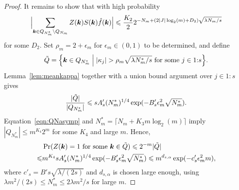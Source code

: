 \documentclass{article}
\theoremstyle{definition}
\renewcommand{\le}{\leqslant}
\renewcommand{\leq}{\leqslant}
\newcommand{\bsk}{\boldsymbol{k}}
\begin{document}
\begin{proof}
It remains to show that with high probability
\begin{equation}\label{eqn:K2over2}
    \Bigl|\sum_{\bsk\in Q_{N^*_m}\setminus Q_{N_m} } Z(\bsk)S(\bsk)\hat{f}(\bsk)\Bigr|\le \frac{K_2}{2}2^{-N_m+(2|J|\log_2(m)+D_2)\sqrt{\lambda N_m/s }}
\end{equation}
for some $D_2$. Set $\rho_m=2+\epsilon_m$ for $\epsilon_m\in (0,1)$ to be determined, and define
\begin{equation*}
    \Tilde{Q}=\Bigl\{\bsk\in Q_{N^*_m}\mathrel{\Big|} |\kappa_j|> \rho_m \sqrt{\lambda N^*_m/s} \text{ for some } j \in 1{:}s\Bigr\}.
\end{equation*}
Lemma~\ref{lem:meankappa} together with a union bound argument over $j \in 1{:}s$ gives 
$$\frac{|\Tilde{Q}|}{|Q_{N^*_m}|}\leq sA'_s(N^*_m)^{1/4}\exp(-B'_s \epsilon_m^2 \sqrt{N^*_m}).$$ 
Equation~\eqref{eqn:QNasymp} and $N^*_m=\lceil N_m+K_3m\log_2(m)\rceil$ imply  $|Q_{N^*_m}|\leq m^{K_4}2^m$ for some $K_4$ and large $m$. Hence,
\begin{align}\label{eqn:ZkQtildebound}
 &\Pr(Z(\bsk)=1 \text{ for some }\bsk\in \Tilde{Q})\leq  2^{-m}|\Tilde{Q}| \\ \le & m^{K_4} s A'_s(N^*_m)^{1/4}\exp(-B'_s \epsilon_m^2 \sqrt{N^*_m})
 \le  m^{d_{s,\alpha} }\exp(-c'_s \epsilon_m^2 m), \nonumber
\end{align}
where $c'_s=B's\sqrt{\lambda/(2s)}$ and $d_{s,\alpha} $ is chosen large enough, using $\lambda m^2/(2s)\leq N^*_m \leq 2\lambda m^2/s$ for large $m$.


\end{proof}
\end{document}
